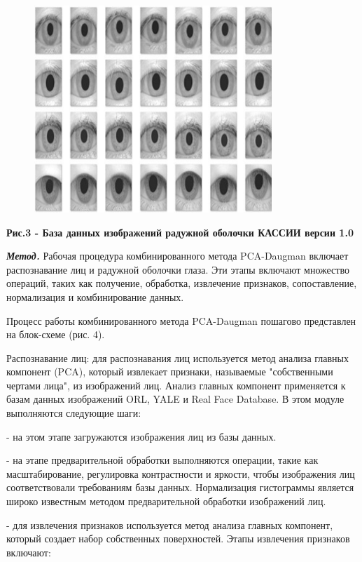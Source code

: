 \begin{figure}[H]
	\centering
	\includegraphics[width=0.8\textwidth]{assets/85}
	\caption*{}
\end{figure}

\textbf{Рис.3 - База данных изображений радужной оболочки КАССИИ версии
1.0}

\emph{\textbf{Метод.}} Рабочая процедура комбинированного метода
PCA-Daugman включает распознавание лиц и радужной оболочки глаза. Эти
этапы включают множество операций, таких как получение, обработка,
извлечение признаков, сопоставление, нормализация и комбинирование
данных.

Процесс работы комбинированного метода PCA-Daugman пошагово представлен
на блок-схеме (рис. 4).

Распознавание лиц: для распознавания лиц используется метод анализа
главных компонент (PCA), который извлекает признаки, называемые
"собственными чертами лица", из изображений лиц. Анализ главных
компонент применяется к базам данных изображений ORL, YALE и Real Face
Database. В этом модуле выполняются следующие шаги:

- на этом этапе загружаются изображения лиц из базы данных.

- на этапе предварительной обработки выполняются операции, такие как
масштабирование, регулировка контрастности и яркости, чтобы изображения
лиц соответствовали требованиям базы данных. Нормализация гистограммы
является широко известным методом предварительной обработки изображений
лиц.

- для извлечения признаков используется метод анализа главных компонент,
который создает набор собственных поверхностей. Этапы извлечения
признаков включают:

